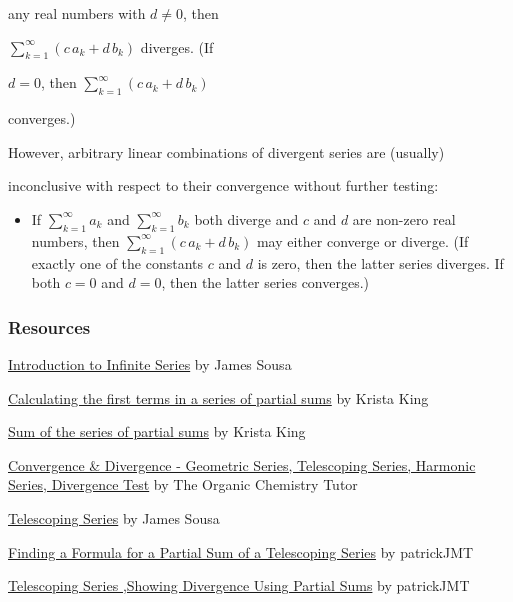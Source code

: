     any real numbers with $d \ne 0$, then

    $\textstyle \sum _{k=1}^{\infty} (c\,a_k+d\,b_k)$ diverges. (If

    $d=0$, then $\textstyle \sum _{k=1}^{\infty} (c\,a_k+d\,b_k)$

    converges.)


However, arbitrary linear combinations of divergent series are (usually)

inconclusive with respect to their convergence without further testing:


\begin{itemize}
    \item If $\textstyle \sum _{k=1}^{\infty} a_k$ and $\textstyle \sum _{k=1}^{\infty} b_k$ both diverge and $c$ and $d$ are non-zero real numbers, then $\textstyle \sum _{k=1}^{\infty} (c\,a_k+d\,b_k)$ may either converge or diverge. (If exactly one of the constants $c$ and $d$ is zero, then the latter series diverges. If both $c=0$ and $d=0$, then the latter series converges.)
\end{itemize}


\subsubsection{Resources}
\label{sss:reso-55b5}


\href{https://youtu.be/jPx2S4mSZWc}{Introduction to Infinite Series} by James Sousa


\href{https://youtu.be/LPFSQoozBL0}{Calculating the first terms in a series of partial sums} by Krista King


\href{https://youtu.be/wpB7nk5J0AA}{Sum of the series of partial sums} by Krista King


\href{https://youtu.be/-wvF8OQSMx8}{Convergence \& Divergence - Geometric Series, Telescoping Series, Harmonic Series, Divergence Test} by The Organic Chemistry Tutor


\href{https://youtu.be/6LfoMmCckFY}{Telescoping Series} by James Sousa


\href{https://youtu.be/cyoiIBs7kIg}{Finding a Formula for a Partial Sum of a Telescoping Series} by patrickJMT


\href{https://youtu.be/xmyLUFv2mDM}{Telescoping Series ,Showing Divergence Using Partial Sums} by patrickJMT


